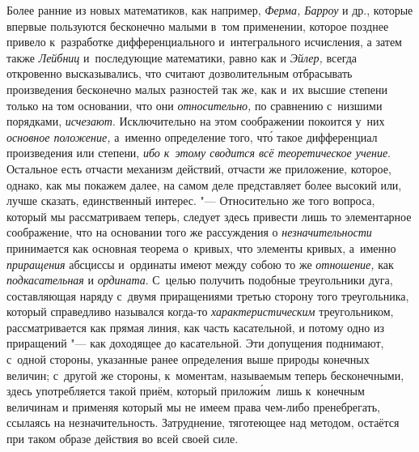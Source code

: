 Более ранние из новых математиков, как например, {\em Ферма, Барроу} и
др., которые впервые пользуются бесконечно малыми в~том применении, которое
позднее привело к~разработке дифференциального и~интегрального исчисления, а
затем также {\em Лейбниц} и~последующие математики, равно как и {\em Эйлер,}
всегда откровенно высказывались, что считают дозволительным отбрасывать
произведения бесконечно малых разностей так же, как и~их высшие степени только
на том основании, что они {\em относительно,} по сравнению с~низшими порядками,
{\em исчезают}. Исключительно на этом соображении покоится у~них
{\em основное положение,} а~именно определение того, чт\'{о} такое дифференциал
произведения или степени, {\em ибо к~этому сводится всё теоретическое
учение}. Остальное есть отчасти механизм действий, отчасти же приложение,
которое, однако, как мы покажем далее, на самом деле представляет более высокий
или, лучше сказать, единственный интерес. "--- Относительно же того вопроса,
который мы рассматриваем теперь, следует здесь привести лишь то элементарное
соображение, что на основании того же рассуждения о {\em незначительности}
принимается как основная теорема о~кривых, что элементы кривых, а~именно
{\em приращения} абсциссы и~ординаты имеют между собою то же {\em отношение,}
как {\em подкасательная} и {\em ордината}. С~целью получить подобные
треугольники дуга, составляющая наряду с~двумя приращениями третью сторону того
треугольника, который справедливо назывался когда-то {\em характеристическим}
треугольником, рассматривается как прямая линия, как часть касательной, и
потому одно из приращений "--- как доходящее до касательной. Эти допущения
поднимают, с~одной стороны, указанные ранее определения выше природы конечных
величин; с~другой же стороны, к~моментам, называемым теперь бесконечными, здесь
употребляется такой приём, который прилож\'{и}м~лишь к~конечным величинам и
применяя который мы не имеем права чем-либо пренебрегать, ссылаясь на
незначительность. Затруднение, тяготеющее над методом, остаётся при таком
образе действия во всей своей силе.

